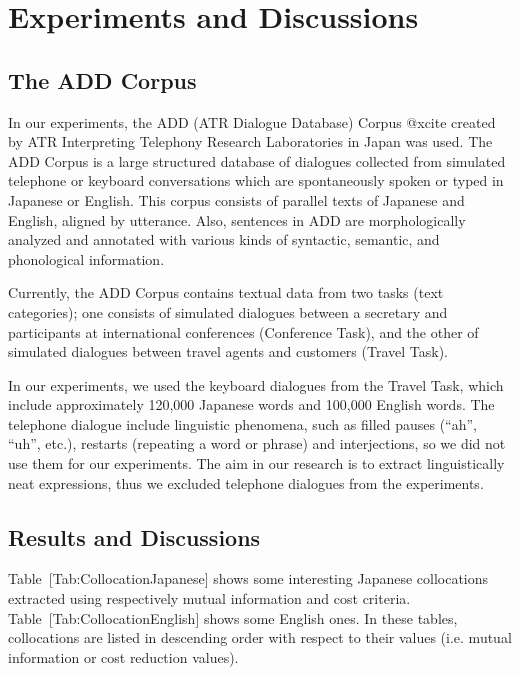 \section{Experiments and Discussions}

\subsection{The ADD Corpus}

In our experiments, the ADD (ATR Dialogue Database) Corpus @xcite
created by ATR Interpreting Telephony Research Laboratories in Japan
was used.
The ADD Corpus is a large structured database of dialogues collected
from simulated telephone or keyboard conversations
which are spontaneously spoken or typed in Japanese or English.
This corpus consists of parallel texts of Japanese and English,
aligned by utterance.
Also, sentences in ADD are morphologically analyzed
and annotated with various kinds of syntactic, semantic, and phonological information.

Currently, the ADD Corpus contains textual data from two tasks (text categories);
one consists of simulated dialogues between a secretary and participants
at international conferences (Conference Task),
and the other of simulated dialogues between travel agents and customers (Travel Task).

In our experiments,
we used the keyboard dialogues from the Travel Task,
which include approximately 120,000 Japanese words
and 100,000 English words.
The telephone dialogue include linguistic phenomena,
such as filled pauses (``ah'', ``uh'', etc.),
restarts (repeating a word or phrase) and interjections,
so we did not use them for our experiments.
The aim in our research is to extract linguistically
neat expressions,
thus we excluded telephone dialogues from the experiments.


\subsection{Results and Discussions}

Table~[Tab:CollocationJapanese]
shows some interesting Japanese collocations extracted
using respectively mutual information and cost criteria.
Table~[Tab:CollocationEnglish] shows some English ones.
In these tables, collocations are listed in descending order
with respect to their values
(i.e. mutual information or cost reduction values).







